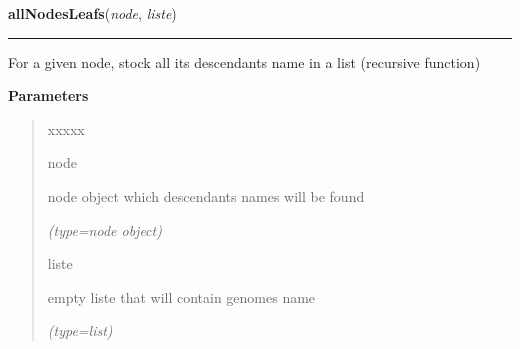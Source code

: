 \hspace{.8\funcindent}\begin{boxedminipage}{\funcwidth}

    \raggedright \textbf{allNodesLeafs}(\textit{node}, \textit{liste})

    \vspace{-1.5ex}

    \rule{\textwidth}{0.5\fboxrule}
\setlength{\parskip}{2ex}
    For a given node, stock all its descendants name in a list (recursive 
    function)

\setlength{\parskip}{1ex}
      \textbf{Parameters}
      \vspace{-1ex}

      \begin{quote}
        \begin{Ventry}{xxxxx}

          \item[node]

          node object which descendants names will be found

            {\it (type=node object)}

          \item[liste]

          empty liste that will contain genomes name

            {\it (type=list)}

        \end{Ventry}

      \end{quote}

    \end{boxedminipage}

    \label{script-phyloFixedVar:groupCompare}

    \vspace{0.5ex}

